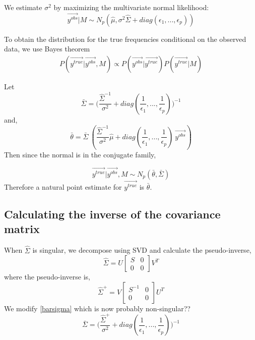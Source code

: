 \documentclass[10pt,a4paper,draft]{article}
\begin{document}
We estimate $\sigma^2$ by maximizing the multivariate normal likelihood:
\begin{equation}
 \vec{y^{obs}}|M \sim N_p(\hat{\mu}, \sigma^2\hat{\Sigma} + diag(\epsilon_1,...,\epsilon_p))
\end{equation}

To obtain the distribution for the true frequencies conditional on the observed data, we use Bayes theorem 
\begin{align*}
P(\vec{y^{true}} | \vec{y^{obs}}, M) \propto P(\vec{y^{obs}} | \vec{y^{true}}) P(\vec{y^{true}}|M)
\end{align*}

Let
\begin{equation} \label{barsigma}
\bar{\Sigma} = \big(\frac{\hat{\Sigma}^{-1}}{\sigma^2} + diag(\frac{1}{\epsilon_1},..., \frac{1}{\epsilon_p})\big)^{-1}
\end{equation}
and,
\begin{equation}
\bar{\theta} = \bar{\Sigma} \ (\frac{\hat{\Sigma}^{-1}}{\sigma^2}\hat{\mu} + diag(\frac{1}{\epsilon_1},..., \frac{1}{\epsilon_p}) \ \vec{y^{obs}})
\end{equation}
Then since the normal is in the conjugate family,

\begin{equation}
\vec{y^{true}} | \vec{y^{obs}}, M \sim N_p(\bar{\theta}, \bar{\Sigma})
\end{equation}
Therefore a natural point estimate for $\vec{y^{true}}$ is $\bar{\theta}$.

\subsection{Calculating the inverse of the covariance matrix}
When $\hat{\Sigma}$ is singular, we decompose using SVD and calculate the pseudo-inverse,
\begin{equation}
\hat{\Sigma} = U 
\begin{bmatrix} S & 0 \\ 0 & 0 \end{bmatrix} V^T
\end{equation}
where the pseudo-inverse is,
\begin{equation}
\hat{\Sigma}^{+} = V \begin{bmatrix} S^{-1} & 0 \\ 0 & 0 \end{bmatrix} U^T
\end{equation}
We modify \ref{barsigma} which is now probably non-singular??
\begin{equation}
\bar{\Sigma} =  \big(\frac{\hat{\Sigma}^{+}}{\sigma^2} + diag(\frac{1}{\epsilon_1},..., \frac{1}{\epsilon_p})\big)^{-1}
\end{equation}
\end{document}
